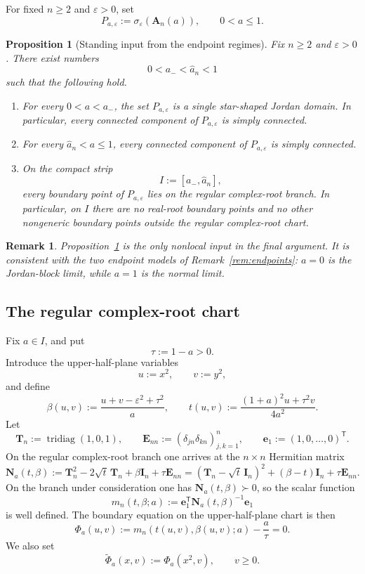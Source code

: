 \documentclass[11pt]{article}
\newtheorem{proposition}[theorem]{Proposition}
\newtheorem{remark}[theorem]{Remark}
\DeclareMathOperator{\tridiag}{tridiag}
\begin{document}
For fixed \(n\ge 2\) and \(\varepsilon>0\), set
\[
P_{a,\varepsilon}:=\sigma_\varepsilon(\mathbf A_n(a)),
\qquad 0<a\le 1.
\]

\begin{proposition}[Standing input from the endpoint regimes]\label{prop:standing-input}
Fix \(n\ge 2\) and \(\varepsilon>0\). There exist numbers
\[
0<a_-<\widehat a_n<1
\]
such that the following hold.

\begin{enumerate}
\item For every \(0<a<a_-\), the set \(P_{a,\varepsilon}\) is a single star-shaped Jordan domain. In particular, every connected component of \(P_{a,\varepsilon}\) is simply connected.

\item For every \(\widehat a_n<a\le 1\), every connected component of \(P_{a,\varepsilon}\) is simply connected.

\item On the compact strip
\[
I:=[a_-,\widehat a_n],
\]
every boundary point of \(P_{a,\varepsilon}\) lies on the regular complex-root branch. In particular, on \(I\) there are no real-root boundary points and no other nongeneric boundary points outside the regular complex-root chart.
\end{enumerate}
\end{proposition}

\begin{remark}
Proposition~\ref{prop:standing-input} is the only nonlocal input in the final argument. It is consistent with the two endpoint models of Remark~\ref{rem:endpoints}: \(a=0\) is the Jordan-block limit, while \(a=1\) is the normal limit.
\end{remark}

\subsection*{The regular complex-root chart}

Fix \(a\in I\), and put
\[
\tau:=1-a>0.
\]
Introduce the upper-half-plane variables
\[
u:=x^2,\qquad v:=y^2,
\]
and define
\[
\beta(u,v):=\frac{u+v-\varepsilon^2+\tau^2}{a},
\qquad
t(u,v):=\frac{(1+a)^2u+\tau^2v}{4a^2}.
\]
Let
\[
\mathbf T_n:=\tridiag(1,0,1),
\qquad
\mathbf E_{nn}:=(\delta_{jn}\delta_{kn})_{j,k=1}^n,
\qquad
\mathbf e_1:=(1,0,\dots,0)^{\mathsf T}.
\]
On the regular complex-root branch one arrives at the \(n\times n\) Hermitian matrix
\[
\mathbf N_a(t,\beta)
:=
\mathbf T_n^2-2\sqrt t\,\mathbf T_n+\beta\mathbf I_n+\tau\mathbf E_{nn}
=
(\mathbf T_n-\sqrt t\,\mathbf I_n)^2+(\beta-t)\mathbf I_n+\tau\mathbf E_{nn}.
\]
On the branch under consideration one has \(\mathbf N_a(t,\beta)\succ 0\), so the scalar function
\[
m_n(t,\beta;a)
:=
\mathbf e_1^{\mathsf T}\mathbf N_a(t,\beta)^{-1}\mathbf e_1
\]
is well defined. The boundary equation on the upper-half-plane chart is then
\[
\Phi_a(u,v)
:=
m_n(t(u,v),\beta(u,v);a)-\frac{a}{\tau}
=
0.
\]
We also set
\[
\widetilde\Phi_a(x,v):=\Phi_a(x^2,v),
\qquad v\ge 0.
\]
\end{document}
